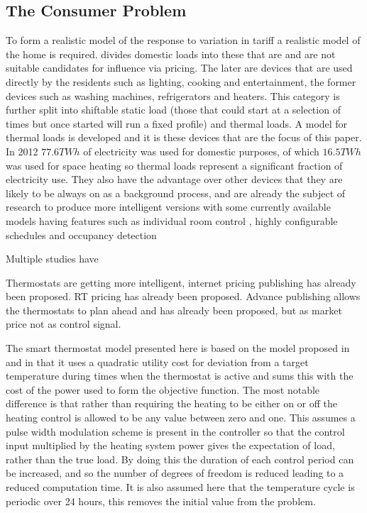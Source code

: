 \documentclass[a4paper, 10 pt, conference]{ieeeconf}  %
\begin{document}


\subsection{The Consumer Problem}
To form a realistic model of the response to variation in tariff a realistic model of the home is required. \cite{ramchurn2011agent} divides domestic loads into these that are and are not suitable candidates for influence via pricing. The later are devices that are used directly by the residents such as lighting, cooking and entertainment, the former devices such as washing machines, refrigerators and heaters. This category is further split into shiftable static load (those that could start at a selection of times but once started will run a fixed profile) and thermal loads. A model for thermal loads is developed and it is these devices that are the focus of this paper. In 2012 $77.6 TWh$ of electricity was used for domestic purposes, of which $16.5 TWh$ was used for space heating \cite{ecuk_data} so thermal loads represent a significant fraction of electricity use. They also have the advantage over other devices that they are likely to be always on as a background process, and are already the subject of research to produce more intelligent versions \cite{rogers2011adaptive} \cite{ramchurn2013agentswitch} with some currently available models having features such as individual room control \cite{honeywell}, highly configurable schedules \cite{nest} and occupancy detection \cite{tado}

Multiple studies have 

Thermostats are getting more intelligent, internet pricing publishing has already been proposed. RT pricing has already been proposed. Advance publishing allows the thermostats to plan ahead and has already been proposed, but as market price not as control signal\cite{rogers2011adaptive}.

The smart thermostat model presented here is based on the model proposed in and in that it uses a quadratic utility cost for deviation from a target temperature during times when the thermostat is active and sums this with the cost of the power used to form the objective function. The most notable difference is that rather than requiring the heating to be either on or off the heating control is allowed to be any value between zero and one. This assumes a pulse width modulation scheme is present in the controller so that the control input multiplied by the heating system power gives the expectation of load, rather than the true load. By doing this the duration of each control period can be increased, and so the number of degrees of freedom is reduced leading to a reduced computation time. It is also assumed here that the temperature cycle is periodic over 24 hours, this removes the initial value from the problem.
\end{document}
